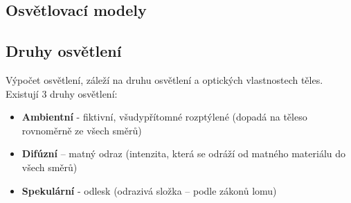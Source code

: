 
\subsection{Osvětlovací modely}
\subsection*{Druhy osvětlení}
Výpočet osvětlení, záleží na druhu osvětlení a optických vlastnostech těles.
Existují 3 druhy osvětlení:
\begin{itemize}
 	\item \textbf{Ambientní}  - fiktivní, všudypřítomné rozptýlené (dopadá na těleso rovnoměrně ze všech směrů)
 	\item \textbf{Difúzní} – matný odraz (intenzita, která se odráží od matného materiálu do všech směrů)
 	\item \textbf{Spekulární}  - odlesk (odrazivá složka – podle zákonů lomu)
\end{itemize}
